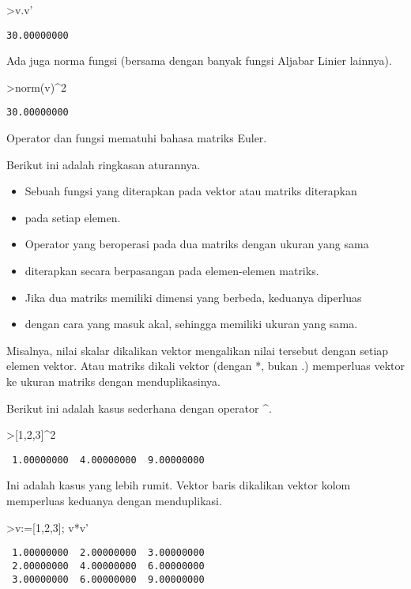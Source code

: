 \documentclass[
]{book}
\begin{document}
\textgreater v.v'

\begin{verbatim}
30.00000000 
\end{verbatim}

Ada juga norma fungsi (bersama dengan banyak fungsi Aljabar Linier lainnya).

\textgreater norm(v)\^{}2

\begin{verbatim}
30.00000000 
\end{verbatim}

Operator dan fungsi mematuhi bahasa matriks Euler.

Berikut ini adalah ringkasan aturannya.

\begin{itemize}
\item
  Sebuah fungsi yang diterapkan pada vektor atau matriks diterapkan
\item
  pada setiap elemen.
\item
  Operator yang beroperasi pada dua matriks dengan ukuran yang sama
\item
  diterapkan secara berpasangan pada elemen-elemen matriks.
\item
  Jika dua matriks memiliki dimensi yang berbeda, keduanya diperluas
\item
  dengan cara yang masuk akal, sehingga memiliki ukuran yang sama.
\end{itemize}

Misalnya, nilai skalar dikalikan vektor mengalikan nilai tersebut dengan setiap elemen vektor. Atau matriks dikali vektor (dengan *, bukan .) memperluas vektor ke ukuran matriks dengan menduplikasinya.

Berikut ini adalah kasus sederhana dengan operator \^{}.

\textgreater{[}1,2,3{]}\^{}2

\begin{verbatim}
 1.00000000  4.00000000  9.00000000 
\end{verbatim}

Ini adalah kasus yang lebih rumit. Vektor baris dikalikan vektor kolom memperluas keduanya dengan menduplikasi.

\textgreater v:={[}1,2,3{]}; v*v'

\begin{verbatim}
 1.00000000  2.00000000  3.00000000 
 2.00000000  4.00000000  6.00000000 
 3.00000000  6.00000000  9.00000000 
\end{verbatim}
\end{document}
